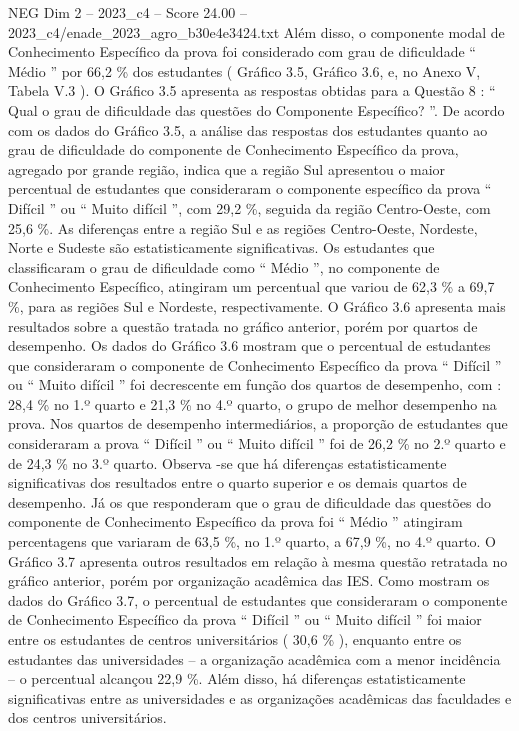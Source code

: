 \begin{textsample}{NEG Dim 2 – 2023\_c4 – Score 24.00 – 2023\_c4/enade\_2023\_agro\_b30e4e3424.txt}
Além disso, o componente modal de Conhecimento Específico da prova foi considerado com grau de dificuldade “ Médio ” por 66,2 \% dos estudantes ( Gráfico 3.5, Gráfico 3.6, e, no Anexo V, Tabela V.3 ).
O Gráfico 3.5 apresenta as respostas obtidas para a Questão 8 : “ Qual o grau de dificuldade das questões do Componente Específico? ”.
De acordo com os dados do Gráfico 3.5, a análise das respostas dos estudantes quanto ao grau de dificuldade do componente de Conhecimento Específico da prova, agregado por grande região, indica que a região Sul apresentou o maior percentual de estudantes que consideraram o componente específico da prova “ Difícil ” ou “ Muito difícil ”, com 29,2 \%, seguida da região Centro-Oeste, com 25,6 \%.
As diferenças entre a região Sul e as regiões Centro-Oeste, Nordeste, Norte e Sudeste são estatisticamente significativas.
Os estudantes que classificaram o grau de dificuldade como “ Médio ”, no componente de Conhecimento Específico, atingiram um percentual que variou de 62,3 \% a 69,7 \%, para as regiões Sul e Nordeste, respectivamente.
O Gráfico 3.6 apresenta mais resultados sobre a questão tratada no gráfico anterior, porém por quartos de desempenho.
Os dados do Gráfico 3.6 mostram que o percentual de estudantes que consideraram o componente de Conhecimento Específico da prova “ Difícil ” ou “ Muito difícil ” foi decrescente em função dos quartos de desempenho, com : 28,4 \% no 1.º quarto e 21,3 \% no 4.º quarto, o grupo de melhor desempenho na prova.
Nos quartos de desempenho intermediários, a proporção de estudantes que consideraram a prova “ Difícil ” ou “ Muito difícil ” foi de 26,2 \% no 2.º quarto e de 24,3 \% no 3.º quarto.
Observa -se que há diferenças estatisticamente significativas dos resultados entre o quarto superior e os demais quartos de desempenho.
Já os que responderam que o grau de dificuldade das questões do componente de Conhecimento Específico da prova foi “ Médio ” atingiram percentagens que variaram de 63,5 \%, no 1.º quarto, a 67,9 \%, no 4.º quarto.
O Gráfico 3.7 apresenta outros resultados em relação à mesma questão retratada no gráfico anterior, porém por organização acadêmica das IES.
Como mostram os dados do Gráfico 3.7, o percentual de estudantes que consideraram o componente de Conhecimento Específico da prova “ Difícil ” ou “ Muito difícil ” foi maior entre os estudantes de centros universitários ( 30,6 \% ), enquanto entre os estudantes das universidades – a organização acadêmica com a menor incidência – o percentual alcançou 22,9 \%.
Além disso, há diferenças estatisticamente significativas entre as universidades e as organizações acadêmicas das faculdades e dos centros universitários.

\end{textsample}
